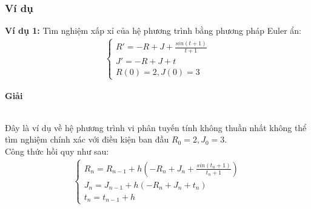 \subsubsection{Ví dụ}
\textbf{Ví dụ 1:} Tìm nghiệm xấp xỉ của hệ phương trình bằng phương pháp Euler ẩn:
\begin{align*}
    \begin{cases}
        R'=-R+J+\frac{sin(t+1)}{t+1}\\
        J'=-R+J+t \\
        R(0)=2, J(0)=3
    \end{cases}
\end{align*}
\centerline{\textbf{Giải}}\\
Đây là ví dụ về hệ phương trình vi phân tuyến tính không thuần nhất không thể tìm nghiệm chính xác với điều kiện ban đầu $R_0=2, J_0=3$.\\
Công thức hồi quy như sau:
\begin{align*}
    \begin{cases}
        R_n=R_{n-1}+h(-R_n+J_n+\frac{sin(t_n+1)}{t_n+1})\\
        J_n=J_{n-1}+h(-R_n+J_n+t_n)\\
        t_n=t_{n-1}+h
    \end{cases}
\end{align*}
